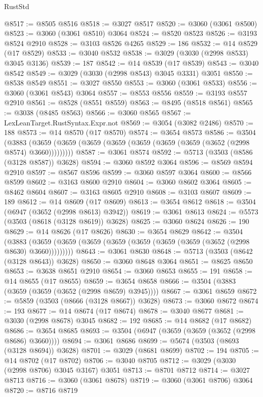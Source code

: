 \begin{lexlean}{RustStd}
\begin{coremodule}
@8517 := @8505 @8516
@8518 := @3027 @8517
@8520 := @3060 (@3061 @8500)
@8523 := @3060 (@3061 @8510) @3064
@8524 := @8520 @8523
@8526 := @3193 @8524 @2910
@8528 := @3103 @8526 @4265
@8529 := 186
@8532 := @14 @8529 (@17 @8529)
@8533 := @3040 @8532
@8538 := @3029 (@3030 (@2998 @8533) @3045 @3136)
@8539 := 187
@8542 := @14 @8539 (@17 @8539)
@8543 := @3040 @8542
@8549 := @3029 (@3030 (@2998 @8543) @3045 @3331) @3051
@8550 := @8538 @8549
@8551 := @3027 @8550
@8553 := @3060 (@3061 @8533)
@8556 := @3060 (@3061 @8543) @3064
@8557 := @8553 @8556
@8559 := @3193 @8557 @2910
@8561 := @8528 (@8551 @8559)
@8563 := @8495 (@8518 @8561)
@8565 := @3038 (@8485 @8563)
@8566 := @3060 @8565
@8567 := LexLeanTarget.RustSyntax.Expr.not
@8569 := @3054 (@3082 @2486)
@8570 := 188
@8573 := @14 @8570 (@17 @8570)
@8574 := @3654 @8573
@8586 := @3504
    (@3883 (@3659 (@3659 (@3659 (@3659 (@3659 (@3659 (@3659 (@3652 (@2998 @8574) @3660)))))))))
@8587 := @3061 @8574
@8592 := @5713 (@3503 (@8586 (@3128 @8587)) @3628)
@8594 := @3060 @8592 @3064
@8596 := @8569 @8594 @2910
@8597 := @8567 @8596
@8599 := @3060 @8597 @3064
@8600 := @8566 @8599
@8602 := @3163 @8600 @2910
@8604 := @3060 @8602 @3064
@8605 := @8462 @8604
@8607 := @3163 @8605 @2910
@8608 := @3103 @8607
@8609 := 189
@8612 := @14 @8609 (@17 @8609)
@8613 := @3654 @8612
@8618 := @3504 (@6947 (@3652 (@2998 @8613) @3942))
@8619 := @3061 @8613
@8624 := @5573 (@3503 (@8618 (@3128 @8619)) @3628)
@8625 := @3060 @8624
@8626 := 190
@8629 := @14 @8626 (@17 @8626)
@8630 := @3654 @8629
@8642 := @3504
    (@3883 (@3659 (@3659 (@3659 (@3659 (@3659 (@3659 (@3659 (@3652 (@2998 @8630) @3660)))))))))
@8643 := @3061 @8630
@8648 := @5713 (@3503 (@8642 (@3128 @8643)) @3628)
@8650 := @3060 @8648 @3064
@8651 := @8625 @8650
@8653 := @3638 @8651 @2910
@8654 := @3060 @8653
@8655 := 191
@8658 := @14 @8655 (@17 @8655)
@8659 := @3654 @8658
@8666 := @3504 (@3883 (@3659 (@3659 (@3652 (@2998 @8659) @3945))))
@8667 := @3061 @8659
@8672 := @5859 (@3503 (@8666 (@3128 @8667)) @3628)
@8673 := @3060 @8672
@8674 := 193
@8677 := @14 @8674 (@17 @8674)
@8678 := @3040 @8677
@8681 := @3030 (@2998 @8678) @3045
@8682 := 192
@8685 := @14 @8682 (@17 @8682)
@8686 := @3654 @8685
@8693 := @3504 (@6947 (@3659 (@3659 (@3652 (@2998 @8686) @3660))))
@8694 := @3061 @8686
@8699 := @5674 (@3503 (@8693 (@3128 @8694)) @3628)
@8701 := @3029 (@8681 @8699)
@8702 := 194
@8705 := @14 @8702 (@17 @8702)
@8706 := @3040 @8705
@8712 := @3029 (@3030 (@2998 @8706) @3045 @3167) @3051
@8713 := @8701 @8712
@8714 := @3027 @8713
@8716 := @3060 (@3061 @8678)
@8719 := @3060 (@3061 @8706) @3064
@8720 := @8716 @8719

\end{coremodule}
\end{lexlean}

